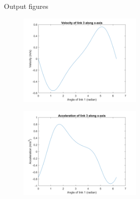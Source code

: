 \begin{frame}{Output figures}
\begin{table}
\begin{minipage}{0.5\linewidth}
	\begin{figure}
		\centering
		\includegraphics[width=60mm]{images/v_RRRT.png}
	\end{figure}
\end{minipage}\hfill
\begin{minipage}{0.5\linewidth}
	\begin{figure}
		\centering
		\includegraphics[width=60mm]{images/a_RRRT.png}
	\end{figure}
\end{minipage}
\end{table}
\end{frame}